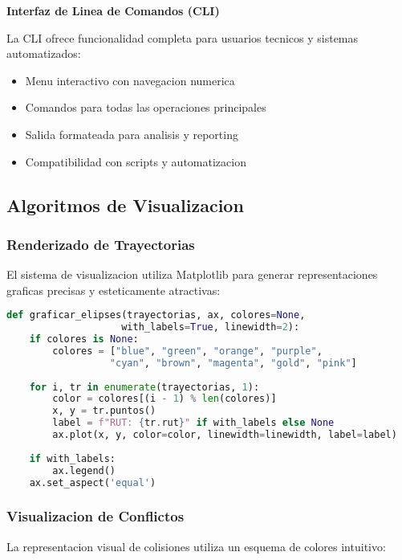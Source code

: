 \documentclass[12pt,a4paper]{article}
\begin{document}
\textbf{Interfaz de Linea de Comandos (CLI)}

La CLI ofrece funcionalidad completa para usuarios tecnicos y sistemas automatizados:

\begin{itemize}
    \item Menu interactivo con navegacion numerica
    \item Comandos para todas las operaciones principales
    \item Salida formateada para analisis y reporting
    \item Compatibilidad con scripts y automatizacion
\end{itemize}

\subsection{Algoritmos de Visualizacion}

\subsubsection{Renderizado de Trayectorias}

El sistema de visualizacion utiliza Matplotlib para generar representaciones graficas precisas y esteticamente atractivas:

\begin{lstlisting}[language=Python, caption=Funcion de graficado de elipses]
def graficar_elipses(trayectorias, ax, colores=None, 
                    with_labels=True, linewidth=2):
    if colores is None:
        colores = ["blue", "green", "orange", "purple", 
                  "cyan", "brown", "magenta", "gold", "pink"]
    
    for i, tr in enumerate(trayectorias, 1):
        color = colores[(i - 1) % len(colores)]
        x, y = tr.puntos()
        label = f"RUT: {tr.rut}" if with_labels else None
        ax.plot(x, y, color=color, linewidth=linewidth, label=label)
    
    if with_labels:
        ax.legend()
    ax.set_aspect('equal')
\end{lstlisting}

\subsubsection{Visualizacion de Conflictos}

La representacion visual de colisiones utiliza un esquema de colores intuitivo:
\end{document}
